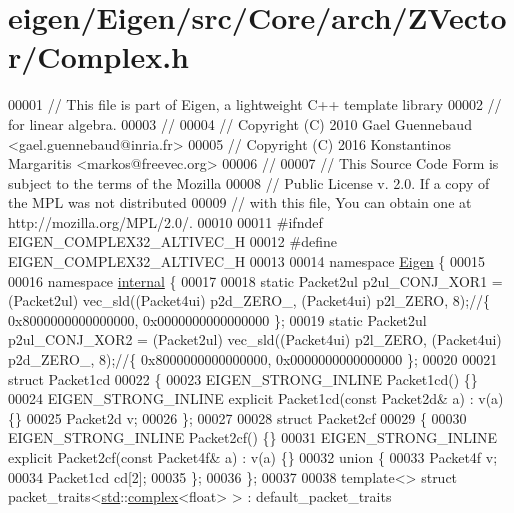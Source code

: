 \hypertarget{eigen_2_eigen_2src_2_core_2arch_2_z_vector_2_complex_8h_source}{}\section{eigen/\+Eigen/src/\+Core/arch/\+Z\+Vector/\+Complex.h}
\label{eigen_2_eigen_2src_2_core_2arch_2_z_vector_2_complex_8h_source}

\begin{DoxyCode}
00001 \textcolor{comment}{// This file is part of Eigen, a lightweight C++ template library}
00002 \textcolor{comment}{// for linear algebra.}
00003 \textcolor{comment}{//}
00004 \textcolor{comment}{// Copyright (C) 2010 Gael Guennebaud <gael.guennebaud@inria.fr>}
00005 \textcolor{comment}{// Copyright (C) 2016 Konstantinos Margaritis <markos@freevec.org>}
00006 \textcolor{comment}{//}
00007 \textcolor{comment}{// This Source Code Form is subject to the terms of the Mozilla}
00008 \textcolor{comment}{// Public License v. 2.0. If a copy of the MPL was not distributed}
00009 \textcolor{comment}{// with this file, You can obtain one at http://mozilla.org/MPL/2.0/.}
00010 
00011 \textcolor{preprocessor}{#ifndef EIGEN\_COMPLEX32\_ALTIVEC\_H}
00012 \textcolor{preprocessor}{#define EIGEN\_COMPLEX32\_ALTIVEC\_H}
00013 
00014 \textcolor{keyword}{namespace }\hyperlink{namespace_eigen}{Eigen} \{
00015 
00016 \textcolor{keyword}{namespace }\hyperlink{namespaceinternal}{internal} \{
00017 
00018 \textcolor{keyword}{static} Packet2ul  p2ul\_CONJ\_XOR1 = (Packet2ul) vec\_sld((Packet4ui) p2d\_ZERO\_, (Packet4ui) p2l\_ZERO, 8);\textcolor{comment}{//\{
       0x8000000000000000, 0x0000000000000000 \};}
00019 \textcolor{keyword}{static} Packet2ul  p2ul\_CONJ\_XOR2 = (Packet2ul) vec\_sld((Packet4ui) p2l\_ZERO,  (Packet4ui) p2d\_ZERO\_, 8);\textcolor{comment}{//\{
       0x8000000000000000, 0x0000000000000000 \};}
00020 
00021 \textcolor{keyword}{struct }Packet1cd
00022 \{
00023   EIGEN\_STRONG\_INLINE Packet1cd() \{\}
00024   EIGEN\_STRONG\_INLINE \textcolor{keyword}{explicit} Packet1cd(\textcolor{keyword}{const} Packet2d& a) : v(a) \{\}
00025   Packet2d v;
00026 \};
00027 
00028 \textcolor{keyword}{struct }Packet2cf
00029 \{
00030   EIGEN\_STRONG\_INLINE Packet2cf() \{\}
00031   EIGEN\_STRONG\_INLINE \textcolor{keyword}{explicit} Packet2cf(\textcolor{keyword}{const} Packet4f& a) : v(a) \{\}
00032   \textcolor{keyword}{union }\{
00033     Packet4f v;
00034     Packet1cd cd[2];
00035   \};
00036 \};
00037 
00038 \textcolor{keyword}{template}<> \textcolor{keyword}{struct }packet\_traits<\hyperlink{namespacestd}{std}::\hyperlink{structcomplex}{complex}<float> >  : default\_packet\_traits

\end{DoxyCode}
